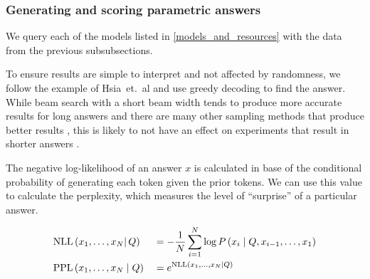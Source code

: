 
\subsubsection{Generating and scoring parametric answers}
\label{generating_and_scoring}

We query each of the models listed in \cref{models_and_resources} with the data from the previous subsubsections.

To ensure results are simple to interpret and not affected by randomness, we follow the example of Hsia~et.~al \citep{ragged} and use greedy decoding to find the answer.
While beam search with a short beam width tends to produce more accurate results for long answers \citep{sutskever_seq2seqlearning,wu_mltranslation} and there are many other sampling methods that produce better results \citep{text_degeneration}, this is likely to not have an effect on experiments that result in shorter answers \citep{t5}.

The negative log-likelihood of an answer $x$ is calculated in base of the conditional probability of generating each token given the prior tokens.
We can use this value to calculate the perplexity, which measures the level of ``surprise'' of a particular answer.

\begin{equation}
	\begin{aligned}
		&\text{NLL} \left( x_1, \dots, x_N \right | Q) &&= - \frac{1}{N} \sum^N_{i = 1} \log P \left( x_i \mid Q, x_{i - 1}, \dots, x_1 \right) \\
		&\text{PPL} \left( x_1, \dots, x_N \mid Q \right) &&= e^{\text{NLL} \left(x_1, \dots, x_N \mid Q \right)}
	\end{aligned}
\end{equation}


